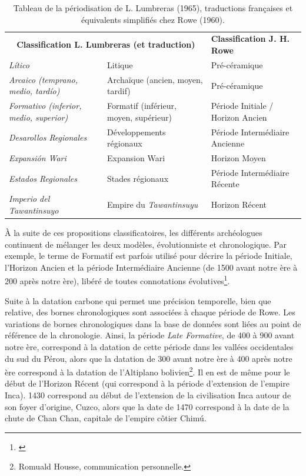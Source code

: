 \begin{table}[!h]
   \centering
    \begin{tabular}{|p{}|p{}|p{}|}
         \cline{1-3}
         \multicolumn{2}{|c|}{ \textbf{Classification L. Lumbreras (et traduction)}} & \textbf{Classification J. H. Rowe} \\ [1ex]  \cline{1-3}
         \textit{Lítico} &  Litique & Pré-céramique \\ [1ex]\hline
          \textit{Arcaico (temprano, medio, tardío)} & Archaïque (ancien, moyen, tardif) & Pré-céramique \\ \hline
          \textit{Formativo (inferior, medio, superior)} & Formatif (inférieur, moyen, supérieur) & Période Initiale / Horizon Ancien \\ \hline
          \textit{Desarollos Regionales} & Développements régionaux &  Période Intermédiaire Ancienne\\[1ex] \hline
          \textit{Expansión Wari} & Expansion Wari &  Horizon Moyen \\[1ex] \hline
          \textit{Estados Regionales} & Stades régionaux & Période Intermédiaire Récente \\ [1ex]\hline
          \textit{Imperio del Tawantinsuyo} & Empire du \textit{Tawantinsuyu} & Horizon Récent \\ [1ex]\hline
    \end{tabular} 
    \caption{\centering Tableau de la périodisation de L. Lumbreras (1965), traductions françaises et équivalents simplifiés chez Rowe (1960).}
    \label{tab:periods}
\end{table}  

\clearpage

À la suite de ces propositions classificatoires, les différents archéologues continuent de mélanger les deux modèles, évolutionniste et chronologique. Par exemple, le terme de Formatif est parfois utilisé pour décrire la période Initiale, l'Horizon Ancien et la période Intermédiaire Ancienne (de 1500 avant notre ère à 200 après notre ère), libéré de toutes connotations évolutives\footnote{\cite[p.~22]{ramonjoffrePeriodificacionArqueologiaPeruana2005}}. 

Suite à la datation carbone qui permet une précision temporelle, bien que relative, des bornes chronologiques sont associées à chaque période de Rowe. Les variations de bornes chronologiques dans la base de données sont liées au point de référence de la chronologie. Ainsi, la période \og \textit{Late Formative}\fg, de 400 à 900 avant notre ère, correspond à la datation de cette période dans les vallées occidentales du sud du Pérou, alors que la datation de 300 avant notre ère à 400 après notre ère correspond à la datation de l'Altiplano bolivien\footnote{Romuald Housse, communication personnelle.}. Il en est de même pour le début de l'Horizon Récent (qui correspond à la période d'extension de l'empire Inca). 1430 correspond au début de l'extension de la civilisation Inca autour de son foyer d'origine, Cuzco, alors que la date de 1470 correspond à la date de la chute de Chan Chan, capitale de l'empire côtier Chimú. 

